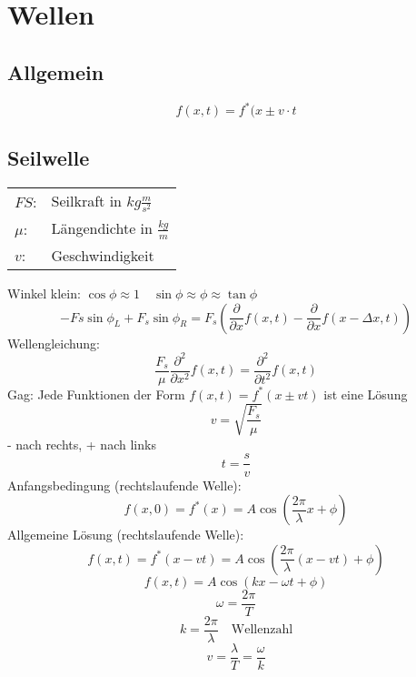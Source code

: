 



\chapter{Wellen}
\section{Allgemein}
\[ \boxed{f(x,t) = f^*(x \pm v \cdot t} \]

\section{Seilwelle}
\begin{tabular}{@{}ll}
$FS$:   & Seilkraft in $kg \frac{m}{s^2}$ \\
$\mu$:  & Längendichte in $\frac{kg}{m}$ \\
$v$:    & Geschwindigkeit
\end{tabular}
Winkel klein: $\cos\phi \approx 1 \quad \sin\phi \approx \phi \approx \tan\phi$
\[ \boxed{-Fs \sin \phi_L + F_s \sin \phi_R 
= F_s (\frac{\partial}{\partial x} f(x,t) 
- \frac{\partial}{\partial x} f(x-\Delta x,t) )} \]
Wellengleichung: 
\[ \boxed{\frac{F_s}{\mu} \frac{\partial^2}{\partial x^2} f(x,t) 
= \frac{\partial^2}{\partial t^2} f(x,t)} \]
Gag: Jede Funktionen der Form $f(x,t) = f^*(x \pm v t)$ ist eine Lösung
\[ \boxed{v = \sqrt{\frac{F_s}{\mu}}} \]
- nach rechts, + nach links
\[ \boxed{t = \frac{s}{v}} \]
Anfangsbedingung (rechtslaufende Welle): 
\[ \boxed{f(x,0) = f^*(x) = A \cos(\frac{2 \pi}{\lambda} x + \phi)} \]
Allgemeine Lösung (rechtslaufende Welle): 
\[ \boxed{f(x,t) = f^*(x-vt) = A \cos (\frac{2 \pi}{\lambda}(x-vt)+\phi)} \]
\[ \boxed{f(x,t) = A \cos(kx-\omega t + \phi)} \]
\[ \boxed{\omega = \frac{2 \pi}{T}} \]
\[ \boxed{k = \frac{2 \pi}{\lambda} \quad \text{Wellenzahl}} \]
\[ \boxed{v = \frac{\lambda}{T} = \frac{\omega}{k}} \]

